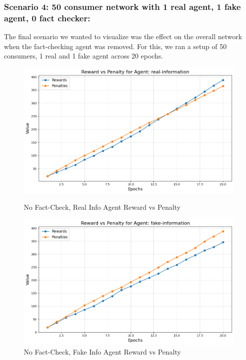 \documentclass[twoside]{article}
\begin{document}
 \pagebreak
\subsubsection{Scenario 4: 50 consumer network with 1 real agent, 1 fake agent, 0 fact checker:}

The final scenario we wanted to visualize was the effect on the overall network when the fact-checking agent was removed. For this, we ran a setup of 50 consumers, 1 real and 1 fake agent across 20 epochs.

\begin{figure}[htbp]
     \centering
     \begin{minipage}[b]{0.45\textwidth}
         \centering
         \includegraphics[width=\textwidth]{../results/no_fact_checker/real.png}
         \caption{No Fact-Check, Real Info Agent Reward vs Penalty}
         \label{fig: real agent, no fact}
     \end{minipage}
     \hfill
     \begin{minipage}[b]{0.45\textwidth}
         \centering
         \includegraphics[width=\textwidth]{../results/no_fact_checker/fake.png}
         \caption{No Fact-Check, Fake Info Agent Reward vs Penalty}
         \label{fig: fake agent, no fact}
     \end{minipage}
 \end{figure}
\end{document}
